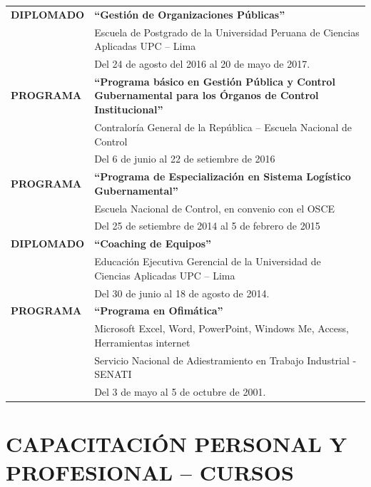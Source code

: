 \documentclass[11pt,a4paper]{article}
\begin{document}
\noindent
\begin{tabularx}{\textwidth}{@{}l@{\hspace{1em}}X@{}}
\textbf{DIPLOMADO} & \textbf{``Gesti\'on de Organizaciones P\'ublicas''}\\
& Escuela de Postgrado de la Universidad Peruana de Ciencias Aplicadas UPC -- Lima\\
& Del 24 de agosto del 2016 al 20 de mayo de 2017.\\[6pt]

\textbf{PROGRAMA} & \textbf{``Programa b\'asico en Gesti\'on P\'ublica y Control Gubernamental para los \'Organos de Control Institucional''}\\
& Contralor\'ia General de la Rep\'ublica -- Escuela Nacional de Control\\
& Del 6 de junio al 22 de setiembre de 2016\\[6pt]

\textbf{PROGRAMA} & \textbf{``Programa de Especializaci\'on en Sistema Log\'istico Gubernamental''}\\
& Escuela Nacional de Control, en convenio con el OSCE\\
& Del 25 de setiembre de 2014 al 5 de febrero de 2015\\[6pt]

\textbf{DIPLOMADO} & \textbf{``Coaching de Equipos''}\\
& Educaci\'on Ejecutiva Gerencial de la Universidad de Ciencias Aplicadas UPC -- Lima\\
& Del 30 de junio al 18 de agosto de 2014.\\[6pt]

\textbf{PROGRAMA} & \textbf{``Programa en Ofim\'atica''}\\
& Microsoft Excel, Word, PowerPoint, Windows Me, Access, Herramientas internet\\
& Servicio Nacional de Adiestramiento en Trabajo Industrial - SENATI\\
& Del 3 de mayo al 5 de octubre de 2001.\\
\end{tabularx}

\section{CAPACITACI\'ON PERSONAL Y PROFESIONAL -- CURSOS}
\end{document}
